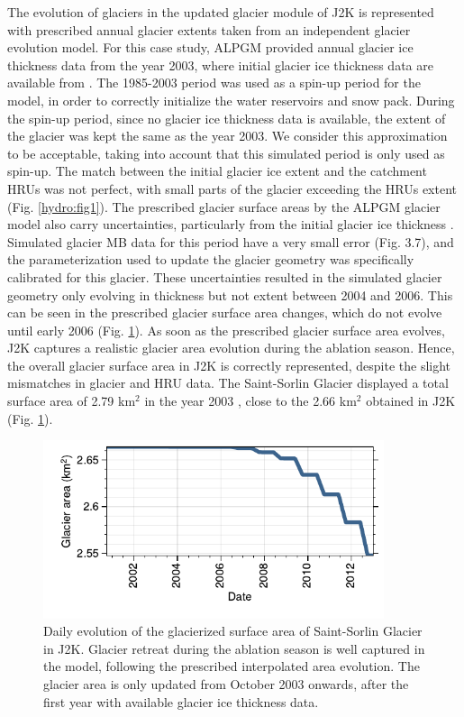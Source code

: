 The evolution of glaciers in the updated glacier module of J2K is represented with prescribed annual glacier extents taken from an independent glacier evolution model. For this case study, ALPGM provided annual glacier ice thickness data from the year 2003, where initial glacier ice thickness data are available from \citet{farinotti_consensus_2019}. The 1985-2003 period was used as a spin-up period for the model, in order to correctly initialize the water reservoirs and snow pack. During the spin-up period, since no glacier ice thickness data is available, the extent of the glacier was kept the same as the year 2003. We consider this approximation to be acceptable, taking into account that this simulated period is only used as spin-up. The match between the initial glacier ice extent and the catchment HRUs was not perfect, with small parts of the glacier exceeding the HRUs extent (Fig. \ref{hydro:fig1}). The prescribed glacier surface areas by the ALPGM glacier model also carry uncertainties, particularly from the initial glacier ice thickness \citep{bolibar_deep_2020}. Simulated glacier MB data for this period have a very small error (Fig. 3.7), and the parameterization used to update the glacier geometry was specifically calibrated for this glacier. These uncertainties resulted in the simulated glacier geometry only evolving in thickness but not extent between 2004 and 2006. This can be seen in the prescribed glacier surface area changes, which do not evolve until early 2006 (Fig. \ref{hydro:fig3}). As soon as the prescribed glacier surface area evolves, J2K captures a realistic glacier area evolution during the ablation season. Hence, the overall glacier surface area in J2K is correctly represented, despite the slight mismatches in glacier and HRU data. The Saint-Sorlin Glacier displayed a total surface area of 2.79 km$^{2}$ in the year 2003 \citep{gardent_multitemporal_2014}, close to the 2.66 km$^{2}$ obtained in J2K (Fig. \ref{hydro:fig3}). 

\begin{figure}[h]
\centering
\includegraphics[width=10cm]{Figures/hydro/Figure_3.pdf}
\caption{Daily evolution of the glacierized surface area of Saint-Sorlin Glacier in J2K. Glacier retreat during the ablation season is well captured in the model, following the prescribed interpolated area evolution. The glacier area is only updated from October 2003 onwards, after the first year with available glacier ice thickness data.} 
\label{hydro:fig3}
\end{figure}

